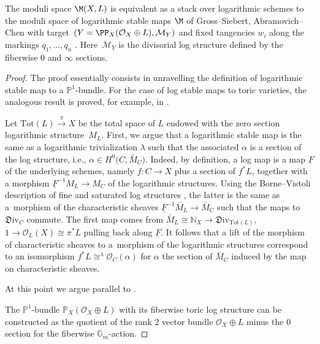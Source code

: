 \begin{prop}\label{prop:logstabelmaps}
The moduli space $\M(X,L)$ is equivalent as a stack over logarithmic schemes to the moduli space of logarithmic stable maps $\M$ of Gross--Siebert, Abramovich--Chen with target~${(Y=\PP_X(\mathcal O_X\oplus L),\mathcal M_Y)}$ and fixed tangencies $w_i$ along the markings $q_1,\dots,q_n$ {\rm\cite{abramovich2014stable,gross2013logarithmic}}. Here~$\mathcal M_Y$ is the divisorial log structure defined by the fiberwise $0$ and $\infty$ sections.
\end{prop}
\begin{proof}
The proof essentially consists in unravelling the definition of logarithmic stable map to a $\mathbb P^1$-bundle. For the case of log stable maps to toric varieties, the analogous result is proved, for example, in \cite[Proposition~2.5.1.1]{RSPW2}.

Let $\mathrm{Tot}(L)\xrightarrow{\pi} X$ be the total space of $L$ endowed with the zero section logarithmic structure~$M_L$. First, we argue that a logarithmic stable map
 is the same as a logarithmic trivialization $\lambda$ such that the associated $\alpha$ is a section of the log structure, i.e., $\alpha\in H^0\bigl(C,\bar{M}_C\bigr)$.
Indeed, by definition, a log map is a map $\underline{F}$ of the underlying schemes, namely $f\colon C\to X$ plus a section of $f^*L$, together with a morphism $\underline{F}^{-1}M_L\to M_C$ of the logarithmic structures. Using the Borne--Vistoli description of fine and saturated log structures \cite{BorneVistoli}, the latter is the same as a~morphism of the characteristic sheaves $\underline{F}^{-1}\bar{M}_L\to \bar{M}_C$ such that the maps to $\mathfrak{D}\mathrm{iv}_C$ commute. The first map comes from
$
 \bar{M}_L\cong\mathbb N_X\to \mathfrak{D}\mathrm{iv}_{\mathrm{Tot}(L)}$, $
1\to \mathcal O_L(X)\cong \pi^* L
$
pulling back along $\underline{F}$. It follows that a lift of the morphism of characteristic sheaves to a~morphism of the logarithmic structures correspond to an isomorphism $f^*L\cong^{\lambda}\mathcal O_C(\alpha)$ for $\alpha$ the section of $\bar{M}_C$ induced by the map on characteristic sheaves.

At this point we argue parallel to \cite[Section~2.5.1]{RSPW2}.

The $\mathbb P^1$-bundle $\mathbb P_X(\mathcal O_X\oplus L)$ with its fiberwise toric log structure can be constructed as the quotient of the rank 2 vector bundle $\mathcal O_X\oplus L$ minus the $0$ section for the fiberwise $\mathbb G_m$-action.


\end{proof}
